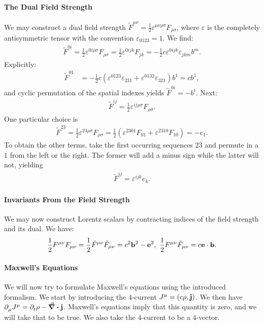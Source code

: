 \paragraph{The Dual Field Strength}
We may construct a dual field strength $\tilde{F}^{\mu\nu} = \frac{1}{2}\varepsilon^{\mu\nu\rho\sigma}F_{\rho\sigma}$, where $\varepsilon$ is the completely antisymmetric tensor with the convention $\varepsilon_{0123} = 1$. We find:
\begin{align*}
	\tilde{F}^{0i} = \frac{1}{2}\varepsilon^{0i\rho\sigma}F_{\rho\sigma} = \frac{1}{2}\varepsilon^{0ijk}F_{jk} = -\frac{1}{2}c\varepsilon^{0ijk}\varepsilon_{jkm}b^{m}.
\end{align*}
Explicitly:
\begin{align*}
	\tilde{F}^{01} &= -\frac{1}{2}c(\varepsilon^{0123}\varepsilon_{231} + \varepsilon^{0132}\varepsilon_{321})b^{1} = cb^{1},
\end{align*}
and cyclic permutation of the spatial indexes yields $\tilde{F}^{0i} = -b^{i}$. Next:
\begin{align*}
	\tilde{F}^{ij} = \frac{1}{2}\varepsilon^{ij\rho\sigma}F_{\rho\sigma}.
\end{align*}
One particular choice is
\begin{align*}
	\tilde{F}^{23} = \frac{1}{2}\varepsilon^{23\rho\sigma}F_{\rho\sigma} = \frac{1}{2}(\varepsilon^{2301}F_{01} + \varepsilon^{2310}F_{10}) = -e_{1}.
\end{align*}
To obtain the other terms, take the first occurring sequences $23$ and permute in a $1$ from the left or the right. The former will add a minus sign while the latter will not, yielding
\begin{align*}
	\tilde{F}^{ij} = \varepsilon^{ijk}e_{k}.
\end{align*}

\paragraph{Invariants From the Field Strength}
We may now construct Lorentz scalars by contracting indices of the field strength and its dual. We have:
\begin{align*}
	\frac{1}{2}F^{\mu\nu}F_{\mu\nu} = \frac{1}{2}\tilde{F}^{\mu\nu}\tilde{F}_{\mu\nu} = c^{2}\vb{b}^{2} - \vb{e}^{2},\ \frac{1}{2}F^{\mu\nu}\tilde{F}_{\mu\nu} = c\vb{e}\cdot\vb{b}.
\end{align*}

\paragraph{Maxwell's Equations}
We will now try to formulate Maxwell's equations using the introduced formalism. We start by introducing the $4$-current $J^{\mu} = (c\rho, \vb{j})$. We then have $\partial^{}_{\mu}J^{\mu} = \partial^{}_{t}\rho - \div{\vb{j}}$. Maxwell's equations imply that this quantity is zero, and we will take that to be true. We also take the $4$-current to be a $4$-vector.

